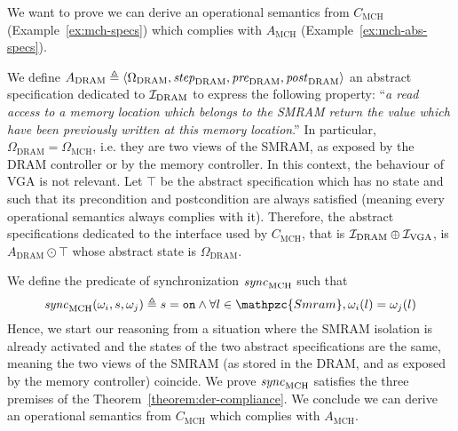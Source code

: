 \begin{example}
  We want to prove we can derive an operational semantics from
  $C_{\mathrm{MCH}}$ (Example~\ref{ex:mch-specs}) which complies with
  $A_{\mathrm{MCH}}$ (Example~\ref{ex:mch-abs-specs}).

  We define
  $A_{\mathrm{DRAM}} \triangleq \langle \Omega_{\mathrm{DRAM}},
  \mathit{step}_{\mathrm{DRAM}}, \mathit{pre}_{\mathrm{DRAM}},
  \mathit{post}_{\mathrm{DRAM}} \rangle$ an abstract specification dedicated to
  $\mathcal{I}_{\mathrm{DRAM}}$ to express the following property: ``\emph{a read access
    to a memory location which belongs to the SMRAM return the value which have
    been previously written at this memory location}.'' In particular,
  $\Omega_{\mathrm{DRAM}} = \Omega_{\mathrm{MCH}}$, i.e. they are two views of
  the SMRAM, as exposed by the DRAM controller or by the memory controller.
  In this context, the behaviour of VGA is not relevant. Let $\top$ be the
  abstract specification which has no state and such that its precondition and
  postcondition are always satisfied (meaning every operational semantics always
  complies with it).
  Therefore, the abstract specifications dedicated to the interface used by
  $C_{\mathrm{MCH}}$, that is $\mathcal{I}_{\mathrm{DRAM}} \oplus \mathcal{I}_{\mathrm{VGA}}$, is
  $A_{\mathrm{DRAM}} \odot \top$ whose abstract state is
  $\Omega_{\mathrm{DRAM}}$.

  We define the predicate of synchronization $\mathit{sync}_{\mathrm{MCH}}$ such
  that
  \[ \func{sync}_{\mathrm{MCH}}(\omega_i, s, \omega_j) \triangleq s = \val{on}
    \wedge \forall l \in \mathpzc{Smram}, \omega_i(l) = \omega_j(l)
  \] Hence, we start our reasoning from a situation where the SMRAM isolation is
  already activated and the states of the two abstract specifications are the
  same, meaning the two views of the SMRAM (as stored in the DRAM, and as
  exposed by the memory controller) coincide.
  We prove $\mathit{sync}_{\mathrm{MCH}}$ satisfies the three premises of the
  Theorem~\ref{theorem:der-compliance}. We conclude we can derive an operational
  semantics from $C_{\mathrm{MCH}}$ which complies with $A_{\mathrm{MCH}}$. 
\end{example}

